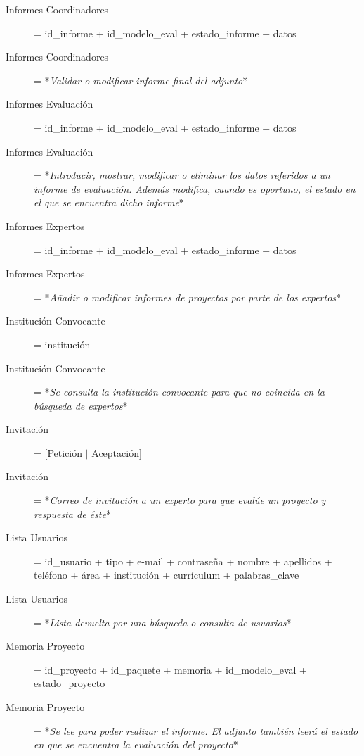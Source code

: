\documentclass[12pt,a4paper,spanish,twoside]{book}
\begin{document}
\begin{description}
\item[Informes Coordinadores] = id\_informe + id\_modelo\_eval +
  estado\_informe + datos 

\item[Informes Coordinadores] = *\emph{Validar o modificar informe final del
    adjunto}* 

\item[Informes Evaluación] = id\_informe + id\_modelo\_eval + estado\_informe
  + datos 

\item[Informes Evaluación] = *\emph{Introducir, mostrar, modificar o eliminar
    los datos referidos a un informe de evaluación. Además modifica, cuando
    es oportuno, el estado en el que se encuentra dicho informe}* 

\item[Informes Expertos] = id\_informe + id\_modelo\_eval + estado\_informe +
  datos 

\item[Informes Expertos] = *\emph{Añadir o modificar informes de proyectos
    por parte de los expertos}* 

\item[Institución Convocante] = institución

\item[Institución Convocante] = *\emph{Se consulta la institución convocante
    para que no coincida en la búsqueda de expertos}* 

\item[Invitación] = [Petición $\mid$ Aceptación]

\item[Invitación] = *\emph{Correo de invitación a un experto para que evalúe
    un proyecto y respuesta de éste}* 

\item[Lista Usuarios] = {id\_usuario + tipo + e-mail + contraseña + nombre +
    apellidos + teléfono + área + institución + currículum +
    {palabras\_clave}} 

\item[Lista Usuarios] = *\emph{Lista devuelta por una búsqueda o consulta de
    usuarios}* 

\item[Memoria Proyecto] = id\_proyecto + id\_paquete + memoria +
  id\_modelo\_eval + estado\_proyecto 

\item[Memoria Proyecto] = *\emph{Se lee para poder realizar el informe. El
    adjunto también leerá el estado en que se encuentra la evaluación del
    proyecto}* 


\end{description}
\end{document}
